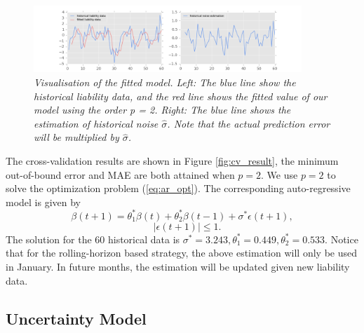 \begin{enumerate}[A)]
    \begin{figure}
        \centering
        \includegraphics[width=0.9\textwidth]{uncertaintyModel.png}
        \caption{\emph{Visualisation of the fitted model. Left: The blue line show the historical liability data, and the red line shows the fitted value of our model using the order p = 2. Right: The blue line shows the estimation of historical noise $\hat{\sigma}$. Note that the actual prediction error will be multiplied by $\hat{\sigma}$.}}
        \label{fig:uncertaintyModel}
    \end{figure} 

    The cross-validation results are shown in Figure \ref{fig:cv_result}, the minimum  out-of-bound error and MAE are both attained when $p=2$. We use $p=2$ to solve the optimization problem (\ref{eq:ar_opt}). The corresponding auto-regressive model is given by
    \begin{equation}\label{eq:ar-est}
        \beta(t+1) = \theta_1^*\beta(t) + \theta_2^*\beta(t-1)+\sigma^*\epsilon(t+1),
    \end{equation}
    \[\quad|\epsilon(t+1)|\leq 1.\]
    The solution for the 60 historical data is
    $\sigma^* = 3.243, \theta^*_1 = 0.449, \theta^*_2 = 0.533.$
    Notice that for the rolling-horizon based strategy, the above estimation will only be used in January. In future months, the estimation will be updated given new liability data.

\end{enumerate}

\subsection{Uncertainty Model}

